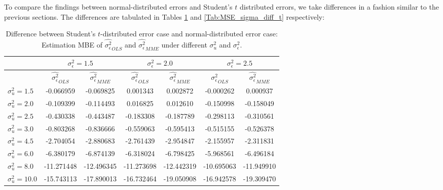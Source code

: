 \documentclass{article}
\begin{document}
To compare the findings between normal-distributed errors and Student's $t$ distributed errors, we take differences in a fashion similar to the previous sections.
The differences are tabulated in Tables \ref{Tab:MBE_sigma_diff_t} and \ref{Tab:MSE_sigma_diff_t} respectively:

\begin{table}[ht]
    \centering
    \caption{Difference between Student's $t$-distributed error case and normal-distributed error case: Estimation MBE of $\hat{\sigma^2_\epsilon}_{OLS}$ and $\hat{\sigma^2_\epsilon}_{MME}$ under different $\sigma^2_u$ and $\sigma^2_\epsilon$.}
    \label{Tab:MBE_sigma_diff_t}
    \begin{tabular}[t]{lcccccc}
        \hline
        &\multicolumn{2}{c}{$\sigma^2_\epsilon=1.5$}&\multicolumn{2}{c}{$\sigma^2_\epsilon=2.0$}&\multicolumn{2}{c}{$\sigma^2_\epsilon=2.5$}\\
        \hline
        &$\hat{\sigma^2_\epsilon}_{OLS}$&$\hat{\sigma^2_\epsilon}_{MME}$&$\hat{\sigma^2_\epsilon}_{OLS}$&
        $\hat{\sigma^2_\epsilon}_{MME}$&$\hat{\sigma^2_\epsilon}_{OLS}$&$\hat{\sigma^2_\epsilon}_{MME}$\\
        \hline
        $\sigma^2_u = 1.5$&-0.066959&-0.069825&0.001343&0.002872&-0.000262&0.000937\\
        $\sigma^2_u = 2.0$&-0.109399&-0.114493&0.016825&0.012610&-0.150998&-0.158049\\
        $\sigma^2_u = 2.5$&-0.430338&-0.443487&-0.183308&-0.187789&-0.298113&-0.310561\\
        $\sigma^2_u = 3.0$&-0.803268&-0.836666&-0.559063&-0.595413&-0.515155&-0.526378\\
        $\sigma^2_u = 4.5$&-2.704054&-2.880683&-2.761439&-2.954847&-2.155957&-2.311831\\
        $\sigma^2_u = 6.0$&-6.380179&-6.874139&-6.318024&-6.798425&-5.968561&-6.496184\\
        $\sigma^2_u = 8.0$&-11.271448&-12.496345&-11.273698&-12.442319&-10.695063&-11.949910\\
        $\sigma^2_u = 10.0$&-15.743113&-17.890013&-16.732464&-19.050908&-16.942578&-19.309470\\
        \hline
    \end{tabular}
\end{table}
\end{document}
